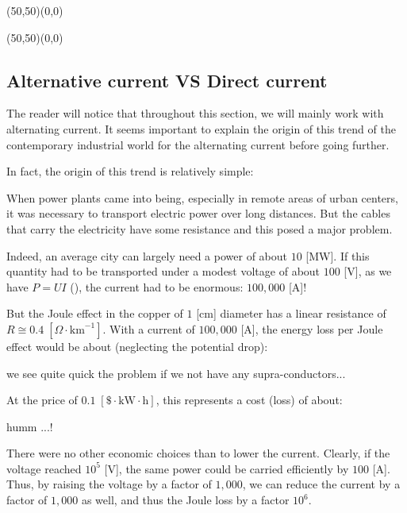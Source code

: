 	\begin{center}
	\begin{picture}(50,50)(0,0)
	\end{picture}
	\begin{picture}(50,50)(0,0)
	\end{picture}
	\end{center}

	\subsection{Alternative current VS Direct current}
	The reader will notice that throughout this section, we will mainly work with alternating current. It seems important to explain the origin of this trend of the contemporary industrial world for the alternating current before going further.

	In fact, the origin of this trend is relatively simple:

	When power plants came into being, especially in remote areas of urban centers, it was necessary to transport electric power over long distances. But the cables that carry the electricity have some resistance and this posed a major problem.

	Indeed, an average city can largely need a power of about $10$ [MW]. If this quantity had to be transported under a modest voltage of about $100$ [V], as we have $P=UI$ (), the current had to be enormous: $100,000$ [A]!

	But the Joule effect in the copper of $1$ [cm] diameter has a linear resistance of $R\cong 0.4\;[\Omega\cdot \text{km}^{-1}]$. With a current of $100,000$ [A], the energy loss per Joule effect would be about (neglecting the potential drop):
	
	we see quite quick the problem if we not have any supra-conductors...

	At the price of $0.1 \;[\$\cdot\text{kW}\cdot \text{h}]$, this represents a cost (loss) of about:
	
	humm ...!
	
	There were no other economic choices than to lower the current. Clearly, if the voltage reached $10^5$ [V], the same power could be carried efficiently by $100$ [A]. Thus, by raising the voltage by a factor of $1,000$, we can reduce the current by a factor of $1,000$ as well, and thus the Joule loss by a factor $10^6$.

